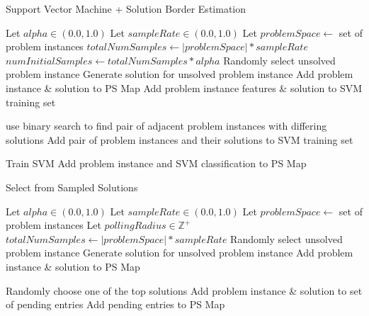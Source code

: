 \begin{algorithm}
\caption{Support Vector Machine + Solution Border Estimation}   
\label{alg:svm+sbe}
\small
\begin{algorithmic}[1] %
  
  \State Let $alpha \in (0.0,1.0)$
  \State Let $sampleRate \in (0.0,1.0)$
  \State Let $problemSpace \leftarrow$ set of problem instances
  \State $totalNumSamples \leftarrow |problemSpace| * sampleRate$
  \State $numInitialSamples \leftarrow totalNumSamples * alpha$ 
    \State Randomly select unsolved problem instance
    \State Generate solution for unsolved problem instance
    \State Add problem instance \& solution to PS Map
    \State Add problem instance features \& solution to SVM training set
  \EndFor

   \label{alg:svmsbe:binarysearch}
    \State use binary search to find pair of adjacent problem instances with differing solutions
    \State Add pair of problem instances and their solutions to SVM training set
  \EndFor

  \State Train SVM
   \label{alg:svmsbe:makemap}
    \State Add problem instance and SVM classification to PS Map
  \EndFor
\end{algorithmic}
\end{algorithm}



\begin{algorithm}
\caption{Select from Sampled Solutions}   
\label{alg:sss}
\small
\begin{algorithmic}[1] 
  
  \State Let $alpha \in (0.0,1.0)$
  \State Let $sampleRate \in (0.0,1.0)$
  \State Let $problemSpace \leftarrow$ set of problem instances
  \State Let $pollingRadius \in \mathbb{Z}^+$ 
  \State $totalNumSamples \leftarrow |problemSpace| * sampleRate$
    \State Randomly select unsolved problem instance
    \State Generate solution for unsolved problem instance
    \State Add problem instance \& solution to PS Map
  \EndFor

      \State Randomly choose one of the top solutions
    \EndIf
    \State Add problem instance \& solution to set of pending entries 
  \EndFor
  \State Add pending entries to PS Map 
\end{algorithmic}
\end{algorithm}


